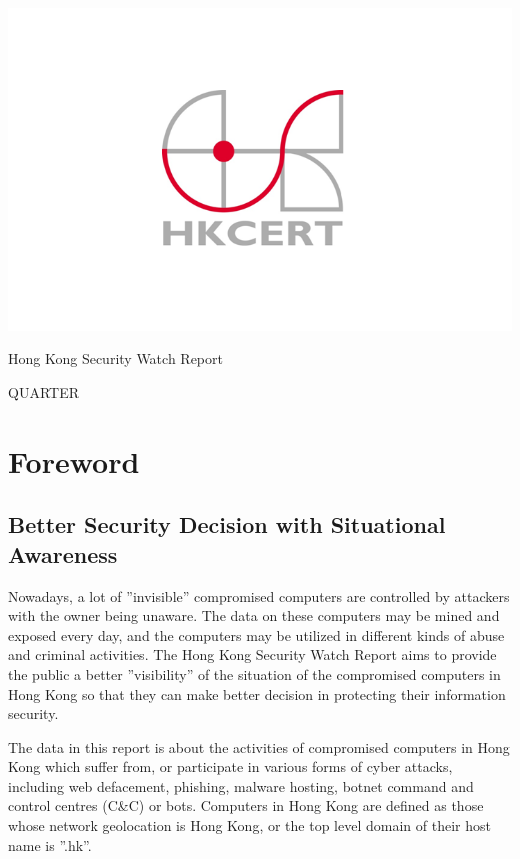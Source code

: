 \documentclass[12pt]{article}
\begin{document}
\vspace{1cm}

\includegraphics{HKCERT}

\vspace{4cm}

\centerline{\Huge Hong Kong Security Watch Report}

\vspace{2.5cm}

\centerline{\huge QUARTER}
\newpage

\section*{Foreword}
\subsection*{Better Security Decision with Situational Awareness}

Nowadays, a lot of ''invisible'' compromised computers are controlled by attackers with the owner being unaware. The data on these computers may be mined and exposed every day, and the computers may be utilized in different kinds of abuse and criminal activities.
The Hong Kong Security Watch Report aims to provide the public a better ''visibility'' of the situation of the compromised computers in Hong Kong so that they can make better decision in protecting their information security.

The data in this report is about the activities of compromised computers in Hong Kong which suffer from, or participate in various forms of cyber attacks, including web defacement, phishing, malware hosting, botnet command and control centres (C\&C) or bots. Computers in Hong Kong are defined as those whose network geolocation is Hong Kong, or the top level domain of their host name is ''.hk''.
\end{document}
